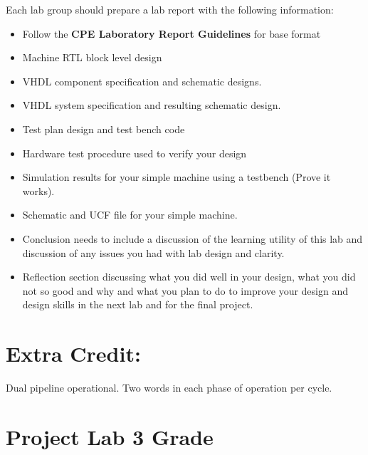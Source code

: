 \documentclass{article}
\begin{document}
Each lab group should prepare a lab report with the following information:
\begin{itemize}
  \item Follow the \textbf{CPE Laboratory Report Guidelines} for base format
  \item Machine RTL block level design
  \item VHDL component specification and schematic designs.
  \item VHDL system specification and resulting schematic design.
  \item Test plan design and test bench code
  \item Hardware test procedure used to verify your design
  \item Simulation results for your simple machine using a testbench (Prove it works).
  \item Schematic and UCF file for your simple machine.
  \item Conclusion needs to include a discussion of the learning utility of this lab and discussion of any issues you had with lab design and clarity.
  \item Reflection section discussing what you did well in your design, what you did not so good and why and what you plan to do to improve your design and design skills in the next lab and for the final project.
\end{itemize}

\section{Extra Credit:}

Dual pipeline operational. Two words in each phase of operation per cycle.

\section{Project Lab 3 Grade}
\end{document}
